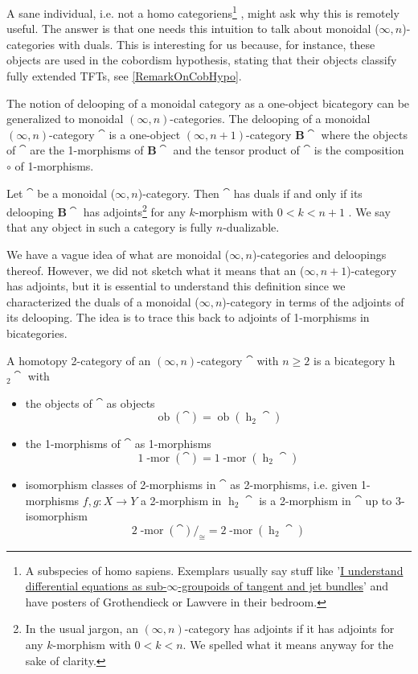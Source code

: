 A sane individual, i.e. not a homo categoriens\footnote{A subspecies of homo sapiens.
     Exemplars usually say stuff like 
     '\href{https://ncatlab.org/nlab/show/differential+equation}{I understand differential equations as sub-$\infty$-groupoids of tangent and jet bundles}'
      and have posters of Grothendieck or Lawvere in their bedroom.}
, might ask why this is remotely useful. The answer is that one needs this intuition to talk about
 monoidal ($\infty,n$)-categories with duals. This is interesting for us because, for 
 instance,  these objects are used in the cobordism hypothesis, stating that their objects
  classify fully extended TFTs,
  see \ref{RemarkOnCobHypo}.
\begin{rem}
    The notion of delooping of a monoidal category as a one-object bicategory can be
     generalized to monoidal $(\infty,n)$-categories. The delooping of a monoidal
      $(\infty,n)$-category $\cat$ is a one-object $(\infty,n+1)$-category $\mathbf{B}\cat$ where the objects of $\cat$ are the 1-morphisms of $\mathbf{B}\cat$ and the tensor product of $\cat$ is the composition $\circ$ of 1-morphisms.
\end{rem}
\begin{defn}\label{HigherMonCatDuals}
    Let $\cat$ be a monoidal ($\infty,n$)-category. Then $\cat$ has duals if and only if its delooping $\mathbf{B}\cat$ has adjoints\footnote{In the usual jargon, an $(\infty,n)$-category has adjoints if it has adjoints
         for any $k$-morphism with $0<k<n$. We spelled what it means anyway for the sake of clarity.} for any $k$-morphism with $0<k<n+1$ . We say that any object in such a
          category is fully $n$-dualizable. 
\end{defn}
We have a vague idea of what are monoidal ($\infty,n$)-categories and deloopings
thereof. However, we did not sketch what it means that an ($\infty,n+1$)-category has
 adjoints, but it is essential to understand this definition
  since we characterized the duals of a monoidal
  ($\infty,n$)-category in terms of the adjoints of its delooping.
  The idea is to trace this back to adjoints of 1-morphisms in bicategories.
  \begin{defn}
A homotopy 2-category of an $(\infty,n)$-category $\cat$ with $n\geq 2$ is a bicategory h$_{2}\cat$
with 
\begin{itemize}
\item  the objects of $\cat$ as objects $$\operatorname{ob}(\cat)=\operatorname{ob}(\operatorname{h}_2\cat)$$
\item the 1-morphisms of $\cat$ as 1-morphisms 
$$1\operatorname{-mor}(\cat)=1\operatorname{-mor}(\operatorname{h}_2\cat)$$ 
\item isomorphism classes of 2-morphisms in $\cat$ as 2-morphisms, i.e. given
1-morphisms $f,g:X\to Y$ a 2-morphism in $\operatorname{h}_2\cat$ is a 2-morphism in $\cat$
up to 3-isomorphism
 $$2\operatorname{-mor}(\cat)/_{\cong}=2\operatorname{-mor}(\operatorname{h}_2\cat)$$ 
\end{itemize}
  \end{defn}
